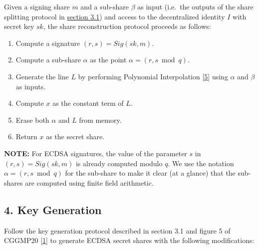 \documentclass[
]{article}
\providecommand{\tightlist}{%
  \setlength{\itemsep}{0pt}\setlength{\parskip}{0pt}}
\begin{document}
Given a signing share \(m\) and a sub-share \(\beta\) as input (i.e.~the
outputs of the share splitting protocol in
\protect\hyperlink{share-splitting}{section 3.1}) and access to the
decentralized identity \(I\) with secret key \(sk\), the share
reconstruction protocol proceeds as follows:

\begin{enumerate}
\def\labelenumi{\arabic{enumi}.}
\tightlist
\item
  Compute a signature \((r, s) = Sig(sk, m)\).
\item
  Compute a sub-share \(\alpha\) as the point
  \(\alpha = (r, s \bmod q)\).
\item
  Generate the line \(L\) by performing Polynomial Interpolation
  {[}\protect\hyperlink{ref-wiki:interpolation}{5}{]} using \(\alpha\)
  and \(\beta\) as inputs.
\item
  Compute \(x\) as the constant term of \(L\).
\item
  Erase both \(\alpha\) and \(L\) from memory.
\item
  Return \(x\) as the secret share.
\end{enumerate}

\textbf{NOTE:} For ECDSA signatures, the value of the parameter \(s\) in
\((r, s) = Sig(sk, m)\) is already computed modulo \(q\). We use the
notation \(\alpha = (r, s \bmod q)\) for the sub-share to make it clear
(at a glance) that the sub-shares are computed using finite field
arithmetic.

\hypertarget{key-generation}{%
\subsection{4. Key Generation}\label{key-generation}}

Follow the key generation protocol described in section 3.1 and figure 5
of CGGMP20 {[}\protect\hyperlink{ref-cggmp20}{1}{]} to generate ECDSA
secret shares with the following modifications:
\end{document}
